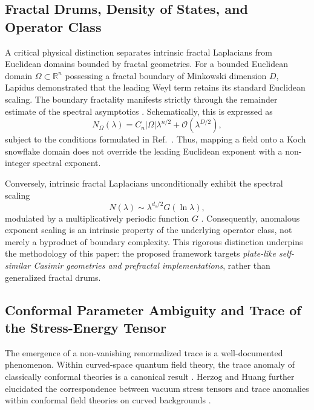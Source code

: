 \documentclass[12pt,letterpaper]{article}
\begin{document}
\subsection{Fractal Drums, Density of States, and Operator Class}

A critical physical distinction separates intrinsic fractal Laplacians from Euclidean domains bounded by fractal geometries.
For a bounded Euclidean domain $\Omega\subset\mathbb R^n$ possessing a fractal boundary of Minkowski dimension $D$, Lapidus demonstrated that the leading Weyl term retains its standard Euclidean scaling.
The boundary fractality manifests strictly through the remainder estimate of the spectral asymptotics \cite{lapidus1991}.
Schematically, this is expressed as
\begin{equation}
N_\Omega(\lambda)=C_n|\Omega|\lambda^{n/2}+\mathcal O(\lambda^{D/2}),
\label{eq:lapidus_schematic}
\end{equation}
subject to the conditions formulated in Ref.~\cite{lapidus1991}.
Thus, mapping a field onto a Koch snowflake domain does not override the leading Euclidean exponent with a non-integer spectral exponent.

Conversely, intrinsic fractal Laplacians unconditionally exhibit the spectral scaling
\begin{equation}
N(\lambda) \sim \lambda^{d_s/2}G(\ln\lambda),
\label{eq:genuine_fractal_counting}
\end{equation}
modulated by a multiplicatively periodic function $G$ \cite{akkermans2010,kajino2010}.
Consequently, anomalous exponent scaling is an intrinsic property of the underlying operator class, not merely a byproduct of boundary complexity.
This rigorous distinction underpins the methodology of this paper: the proposed framework targets \emph{plate-like self-similar Casimir geometries and prefractal implementations}, rather than generalized fractal drums.

\subsection{Conformal Parameter Ambiguity and Trace of the Stress-Energy Tensor}

The emergence of a non-vanishing renormalized trace is a well-documented phenomenon.
Within curved-space quantum field theory, the trace anomaly of classically conformal theories is a canonical result \cite{browncassidy1977,birrelldavies1982}.
Herzog and Huang further elucidated the correspondence between vacuum stress tensors and trace anomalies within conformal field theories on curved backgrounds \cite{herzoghuang2013}.
\end{document}
